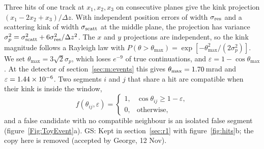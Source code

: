 \documentclass[11pt,a4paper]{article}
\newcommand{\gs}[1]{{\color{orange!85!black} GS: #1 }}
\newcommand{\gss}[1]{{\color{teal} #1}}
\begin{document}
Three hits of one track at $x_1,x_2,x_3$ on consecutive planes give the kink projection
$(x_1-2x_2+x_3)/\Delta z$. With independent position errors of width $\sigma_{\rm res}$ and a
scattering kink of width $\sigma_{\rm scatt}$ at the middle plane, the projection has variance
$\sigma_p^2=\sigma_{\rm scatt}^2+6\sigma_{\rm res}^2/\Delta z^2$. The $x$ and $y$ projections are
independent, so the kink magnitude follows a Rayleigh law with
$P(\theta>\theta_{\max})=\exp[-\theta_{\max}^2/(2\sigma_p^2)]$. We set $\theta_{\max}=3\sqrt2\sigma_p$,
which loses $e^{-9}$ of true continuations, and $\varepsilon=1-\cos\theta_{\max}$. \gss{At the detector of section~\ref{sec:m:events} this gives $\theta_{\max}=1.70$\,mrad and $\varepsilon=1.44\times10^{-6}$. Two segments $i$ and $j$ that share a hit are compatible when their kink is inside the window,
\begin{equation}
f(\theta_{ij},\varepsilon)=\begin{cases}1,&\cos\theta_{ij}\ge1-\varepsilon,\\0,&\text{otherwise},\end{cases}
\end{equation}
and a false candidate with no compatible neighbour is an isolated false segment (figure~\ref{Fig:ToyEvent}a).}
\gs{Kept in section~\mbox{\ref{sec:r1}} with figure~\mbox{\ref{fig:hits}}b; the copy here is removed (accepted by George, 12 Nov).} 
\end{document}
